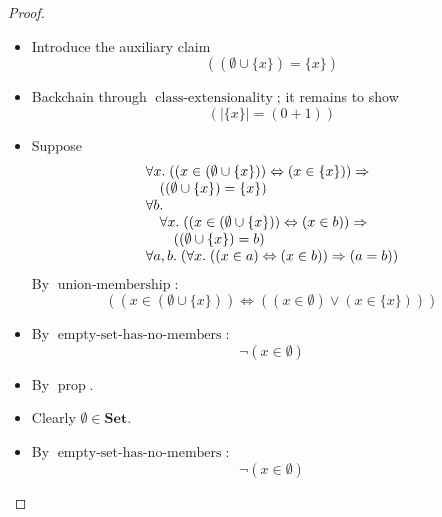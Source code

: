 \documentclass[11pt]{article}
\theoremstyle{plain}
\begin{document}
\begin{proof}
\begin{itemize}[leftmargin=2.8em, itemsep=4pt, parsep=1pt]
  \item[\textbf{2}] Introduce the auxiliary claim
\begin{equation*}
((\emptyset \cup \{x\}) = \{x\})
\end{equation*}

  \item[\textbf{3}] Backchain through $\operatorname{class\text{-}extensionality}$; it remains to show
\begin{equation*}
(|\{x\}| = (0 + 1))
\end{equation*}

  \item[\textbf{4--5}] Suppose 
\begin{equation*}
\begin{array}{@{}l@{}}
\begin{array}{@{}l@{}} \forall x.\; ((x \in (\emptyset \cup \{x\})) \Leftrightarrow (x \in \{x\})) \Rightarrow  \\ \quad ((\emptyset \cup \{x\}) = \{x\}) \end{array} \\
\begin{array}{@{}l@{}} \forall b. \\ \quad \forall x.\; ((x \in (\emptyset \cup \{x\})) \Leftrightarrow (x \in b)) \Rightarrow  \\ \quad \quad ((\emptyset \cup \{x\}) = b) \end{array} \\
\forall a, b.\; (\forall x.\; ((x \in a) \Leftrightarrow (x \in b)) \Rightarrow (a = b))
\end{array}
\end{equation*}
By $\operatorname{union\text{-}membership}$:
\begin{equation*}
((x \in (\emptyset \cup \{x\})) \Leftrightarrow ((x \in \emptyset) \vee (x \in \{x\})))
\end{equation*}

  \item[\textbf{6}] By $\operatorname{empty\text{-}set\text{-}has\text{-}no\text{-}members}$:
\begin{equation*}
\neg (x \in \emptyset)
\end{equation*}

  \item[\textbf{7--15}] By $\operatorname{prop}$.
  \item[\textbf{16}] Clearly $\emptyset \in \mathbf{Set}$.
  \item[\textbf{17}] By $\operatorname{empty\text{-}set\text{-}has\text{-}no\text{-}members}$:
\begin{equation*}
\neg (x \in \emptyset)
\end{equation*}


\end{itemize}
\end{proof}
\end{document}

